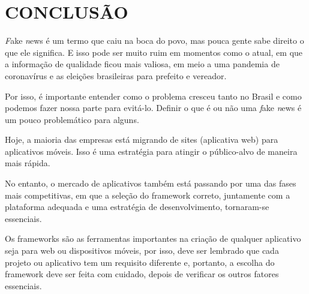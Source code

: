 
\chapter{CONCLUSÃO}
\label{chap:conclusao}

\textit Fake \textit news é um termo que caiu na boca do povo, mas pouca gente sabe direito o que ele significa. E isso pode ser muito ruim em momentos como o atual, em que a informação de qualidade ficou mais valiosa, em meio a uma pandemia de coronavírus e as eleições brasileiras para prefeito e vereador. 

Por isso, é importante entender como o problema cresceu tanto no Brasil e como podemos fazer nossa parte para evitá-lo. Definir o que é ou não uma \textit fake \textit news é um pouco problemático para alguns. 

Hoje, a maioria das empresas está migrando de sites (aplicativa web) para aplicativos móveis. Isso é uma estratégia para atingir o público-alvo de maneira mais rápida.

No entanto, o mercado de aplicativos também está passando por uma das fases mais competitivas, em que a seleção do framework correto, juntamente com a plataforma adequada e uma estratégia de desenvolvimento, tornaram-se essenciais.

Os frameworks são as ferramentas importantes na criação de qualquer aplicativo seja para web ou dispositivos móveis, por isso, deve ser lembrado que cada projeto ou aplicativo tem um requisito diferente e, portanto, a escolha do framework deve ser feita com cuidado, depois de verificar os outros fatores essenciais.
